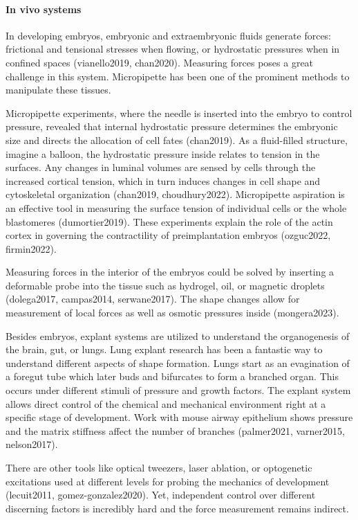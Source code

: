 \documentclass[
]{article}
\begin{document}
\hypertarget{in-vivo-systems}{%
\paragraph{In vivo systems}\label{in-vivo-systems}}

In developing embryos, embryonic and extraembryonic fluids generate
forces: frictional and tensional stresses when flowing, or hydrostatic
pressures when in confined spaces (vianello2019, chan2020). Measuring
forces poses a great challenge in this system. Micropipette has been one
of the prominent methods to manipulate these tissues.

Micropipette experiments, where the needle is inserted into the embryo
to control pressure, revealed that internal hydrostatic pressure
determines the embryonic size and directs the allocation of cell fates
(chan2019). As a fluid-filled structure, imagine a balloon, the
hydrostatic pressure inside relates to tension in the surfaces. Any
changes in luminal volumes are sensed by cells through the increased
cortical tension, which in turn induces changes in cell shape and
cytoskeletal organization (chan2019, choudhury2022). Micropipette
aspiration is an effective tool in measuring the surface tension of
individual cells or the whole blastomeres (dumortier2019). These
experiments explain the role of the actin cortex in governing the
contractility of preimplantation embryos (ozguc2022, firmin2022).

Measuring forces in the interior of the embryos could be solved by
inserting a deformable probe into the tissue such as hydrogel, oil, or
magnetic droplets (dolega2017, campas2014, serwane2017). The shape
changes allow for measurement of local forces as well as osmotic
pressures inside (mongera2023).

Besides embryos, explant systems are utilized to understand the
organogenesis of the brain, gut, or lungs. Lung explant research has
been a fantastic way to understand different aspects of shape formation.
Lungs start as an evagination of a foregut tube which later buds and
bifurcates to form a branched organ. This occurs under different stimuli
of pressure and growth factors. The explant system allows direct control
of the chemical and mechanical environment right at a specific stage of
development. Work with mouse airway epithelium shows pressure and the
matrix stiffness affect the number of branches (palmer2021, varner2015,
nelson2017).

There are other tools like optical tweezers, laser ablation, or
optogenetic excitations used at different levels for probing the
mechanics of development (lecuit2011, gomez-gonzalez2020). Yet,
independent control over different discerning factors is incredibly hard
and the force measurement remains indirect.
\end{document}
